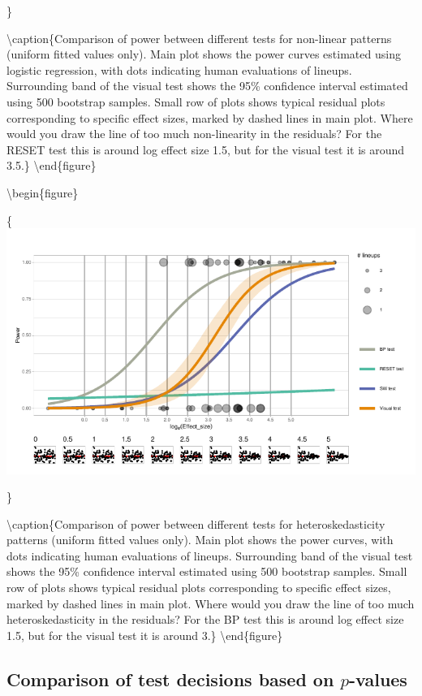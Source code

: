 \documentclass[]{interact}
\theoremstyle{plain}%
\theoremstyle{definition}
\theoremstyle{remark}
\begin{document}
\}

\textbackslash caption\{Comparison of power between different tests for
non-linear patterns (uniform fitted values only). Main plot shows the
power curves estimated using logistic regression, with dots indicating
human evaluations of lineups. Surrounding band of the visual test shows
the 95\% confidence interval estimated using 500 bootstrap samples.
Small row of plots shows typical residual plots corresponding to
specific effect sizes, marked by dashed lines in main plot. Where would
you draw the line of too much non-linearity in the residuals? For the
RESET test this is around log effect size 1.5, but for the visual test
it is around 3.5.\}\label{fig:polypower} \textbackslash end\{figure\}

\textbackslash begin\{figure\}

\{\centering \includegraphics[width=1\linewidth]{paper_comparison_files/figure-latex/heterpower-1}

\}

\textbackslash caption\{Comparison of power between different tests for
heteroskedasticity patterns (uniform fitted values only). Main plot
shows the power curves, with dots indicating human evaluations of
lineups. Surrounding band of the visual test shows the 95\% confidence
interval estimated using 500 bootstrap samples. Small row of plots shows
typical residual plots corresponding to specific effect sizes, marked by
dashed lines in main plot. Where would you draw the line of too much
heteroskedasticity in the residuals? For the BP test this is around log
effect size 1.5, but for the visual test it is around
3.\}\label{fig:heterpower} \textbackslash end\{figure\}

\hypertarget{comparison-of-test-decisions-based-on-p-values}{%
\subsection{\texorpdfstring{Comparison of test decisions based on
\(p\)-values}{Comparison of test decisions based on p-values}}\label{comparison-of-test-decisions-based-on-p-values}}
\end{document}
